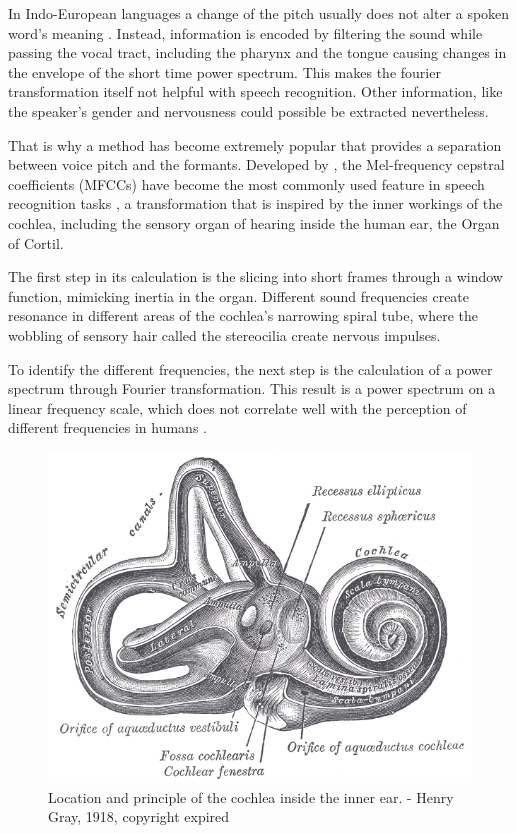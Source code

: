 In Indo-European languages a change of the pitch usually does not alter a spoken word’s meaning \cite{auditoryneuroscience}. Instead, information is encoded by filtering the sound while passing the vocal tract, including the pharynx and the tongue causing changes in the envelope of the short time power spectrum. This makes the fourier transformation itself not helpful with speech recognition. Other information, like the speaker's gender and nervousness could possible be extracted nevertheless.

That is why a method has become extremely popular that provides a separation between voice pitch and the formants. Developed by \cite{noll67}, the Mel-frequency cepstral coefficients (MFCCs) have become the most commonly used feature in speech recognition tasks \cite{ganchev2005comparative}, a transformation that is inspired by the inner workings of the cochlea, including the sensory organ of hearing inside the human ear, the Organ of Cortil. 


The first step in its calculation is the slicing into short frames through a window function, mimicking inertia in the organ. Different sound frequencies create resonance in different areas of the cochlea’s narrowing spiral tube, where the wobbling of sensory hair called the stereocilia create nervous impulses.

To identify the different frequencies, the next step is the calculation of a power spectrum through Fourier transformation. This result is a power spectrum on a linear frequency scale, which does not correlate well with the perception of different frequencies in humans \cite{mel}. 

\begin{figure}[h]
    \centering
	\includegraphics[width=.9\textwidth]{./images/illustrations/Gray921}
    \caption{Location and principle of the cochlea inside the inner ear. - Henry Gray, 1918, copyright expired}
    \label{fig:gray}
\end{figure}

